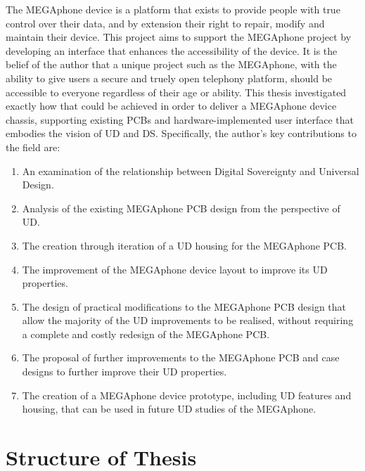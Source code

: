 The MEGAphone device is a platform that exists to provide people with true control over their data, and by extension their right to repair, modify and maintain their device.
This project aims to support the MEGAphone project by developing an interface that enhances the accessibility of the device.
It is the belief of the author that a unique project such as the MEGAphone, with the ability to give users a secure and truely open telephony platform, should be accessible to everyone regardless of their age or ability.
This thesis investigated exactly how that could be achieved in order to deliver a MEGAphone device chassis, supporting existing PCBs and hardware-implemented user interface that embodies the vision of UD and DS.\vspace{5mm} %
\newline
Specifically, the author's key contributions to the field are:
\begin{enumerate}
    \item An examination of the relationship between Digital Sovereignty and Universal Design.
    \item Analysis of the existing MEGAphone PCB design from the perspective of UD.
    \item The creation through iteration of a UD housing for the MEGAphone PCB.
    \item The improvement of the MEGAphone device layout to improve its UD properties.
    \item The design of practical modifications to the MEGAphone PCB design that allow the majority of the UD improvements to be realised, without requiring a complete and costly redesign of the MEGAphone PCB.
    \item The proposal of further improvements to the MEGAphone PCB and case designs to further improve their UD properties.
    \item The creation of a MEGAphone device prototype, including UD features and housing, that can be used in future UD studies of the MEGAphone.
\end{enumerate}

\section{Structure of Thesis}

